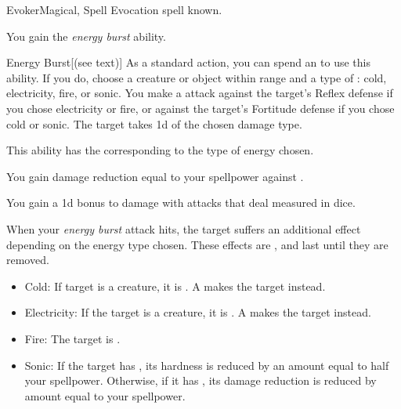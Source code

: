     \begin{feat}{Evoker}{Magical, Spell}
        \featpre Evocation spell known.

         You gain the \textit{energy burst} ability.
        \begin{ability}{Energy Burst}[(see text)]
            As a standard action, you can spend an  to use this ability.
            If you do, choose a creature or object within \rngclose range and a type of : cold, electricity, fire, or sonic.
            You make a  attack against the target's Reflex defense if you chose electricity or fire, or against the target's Fortitude defense if you chose cold or sonic.
            \hit The target takes  \plus1d of the chosen damage type.

            This ability has the  corresponding to the type of energy chosen.
        \end{ability}

         You gain damage reduction equal to your spellpower against .

         You gain a \plus1d bonus to damage with attacks that deal  measured in dice.

         When your \textit{energy burst} attack hits, the target suffers an additional effect depending on the energy type chosen.
        These effects are , and last until they are removed.
        \begin{itemize}
            \item Cold: If target is a creature, it is \fatigued.
                A  makes the target \exhausted instead.
            \item Electricity: If the target is a creature, it is \dazed.
                A  makes the target \stunned instead.
            \item Fire: The target is \ignited.
            \item Sonic: If the target has , its hardness is reduced by an amount equal to half your spellpower. Otherwise, if it has , its damage reduction is reduced by amount equal to your spellpower.
        \end{itemize}


\end{feat}
